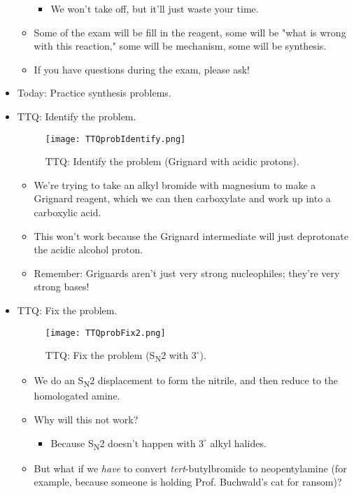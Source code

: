 \documentclass[../notes.tex]{subfiles}
\begin{document}
\begin{itemize}
\begin{itemize}
\begin{itemize}
            \item We won't take off, but it'll just waste your time.
        \end{itemize}
        \item Some of the exam will be fill in the reagent, some will be "what is wrong with this reaction," some will be mechanism, some will be synthesis.
        \item If you have questions during the exam, please ask!
    \end{itemize}
    \item Today: Practice synthesis problems.
    \item TTQ: Identify the problem.
    \begin{figure}[h!]
        \centering
        \texttt{[image: TTQprobIdentify.png]}
        \caption{TTQ: Identify the problem (Grignard with acidic protons).}
        \label{fig:TTQprobIdentify}
    \end{figure}
    \begin{itemize}
        \item We're trying to take an alkyl bromide with magnesium to make a Grignard reagent, which we can then carboxylate and work up into a carboxylic acid.
        \item This won't work because the Grignard intermediate will just deprotonate the acidic alcohol proton.
        \item Remember: Grignards aren't just very strong nucleophiles; they're very strong bases!
    \end{itemize}
    \item TTQ: Fix the problem.
    \begin{figure}[h!]
        \centering
        \texttt{[image: TTQprobFix2.png]}
        \caption{TTQ: Fix the problem (S\textsubscript{N}2 with $3^\circ$).}
        \label{fig:TTQprobFix2}
    \end{figure}
    \begin{itemize}
        \item We do an S\textsubscript{N}2 displacement to form the nitrile, and then reduce to the homologated amine.
        \item Why will this not work?
        \begin{itemize}
            \item Because S\textsubscript{N}2 doesn't happen with $3^\circ$ alkyl halides.
        \end{itemize}
        \item But what if we \emph{have} to convert \emph{tert}-butylbromide to neopentylamine (for example, because someone is holding Prof. Buchwald's cat for ransom)?

\end{itemize}
\end{itemize}
\end{document}
